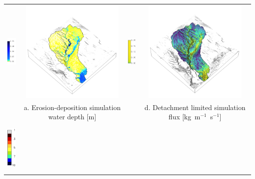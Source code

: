 \documentclass{standalone}
\begin{document}
\scriptsize
\centering 


\begin{tabular}{m{} m{} m{} m{}}
% 
\multicolumn{1}{c}{\includegraphics[height=25mm]{../../images/ss_erdep_3d/legend_depth.png}}
& \multicolumn{1}{c}{\includegraphics[height=50mm]{../../images/ss_erdep_3d/depth.png}} 
& \multicolumn{1}{c}{\includegraphics[height=25mm]{../../images/ss_flux_3d/legend_flux.png}}
& \multicolumn{1}{c}{\includegraphics[height=50mm]{../../images/ss_flux_3d/flux.png}}\\
\multicolumn{1}{c}{} 
& \multicolumn{1}{c}{a. Erosion-deposition simulation water depth [m]}
& \multicolumn{1}{c}{} 
& \multicolumn{1}{c}{d. Detachment limited simulation flux [kg~m$^{-1}$~s$^{-1}$]}\\
%
\multicolumn{1}{c}{\includegraphics[height=25mm]{../../images/ss_erdep_3d/legend_landforms.png}}

\end{tabular}
\end{document}
